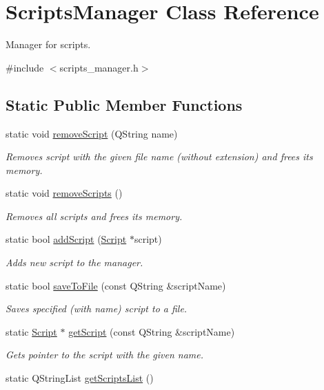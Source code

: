 \hypertarget{class_scripts_manager}{\section{Scripts\-Manager Class Reference}
\label{class_scripts_manager}
}


Manager for scripts.  




{\ttfamily \#include $<$scripts\-\_\-manager.\-h$>$}

\subsection*{Static Public Member Functions}
\begin{DoxyCompactItemize}
\item 
static void \hyperlink{class_scripts_manager_a99ddfb07ac002907cee3b2a5b102abad}{remove\-Script} (Q\-String name)
\begin{DoxyCompactList}\small\item\em Removes script with the given file name (without extension) and frees its memory. \end{DoxyCompactList}\item 
static void \hyperlink{class_scripts_manager_a137f7089f471de89c5d1344d3b5781cd}{remove\-Scripts} ()
\begin{DoxyCompactList}\small\item\em Removes all scripts and frees its memory. \end{DoxyCompactList}\item 
static bool \hyperlink{class_scripts_manager_a67b361d78d35092340feaf556b57565d}{add\-Script} (\hyperlink{class_script}{Script} $\ast$script)
\begin{DoxyCompactList}\small\item\em Adds new script to the manager. \end{DoxyCompactList}\item 
static bool \hyperlink{class_scripts_manager_ad4cd01aab1d6015db90cbca5fae306cf}{save\-To\-File} (const Q\-String \&script\-Name)
\begin{DoxyCompactList}\small\item\em Saves specified (with name) script to a file. \end{DoxyCompactList}\item 
static \hyperlink{class_script}{Script} $\ast$ \hyperlink{class_scripts_manager_a59b613ef7638d97bbdebe09a412e8f20}{get\-Script} (const Q\-String \&script\-Name)
\begin{DoxyCompactList}\small\item\em Gets pointer to the script with the given name. \end{DoxyCompactList}\item 
static Q\-String\-List \hyperlink{class_scripts_manager_a451c8dacfa4629cb69c3f7f1ca0326f0}{get\-Scripts\-List} ()
\end{DoxyCompactItemize}
